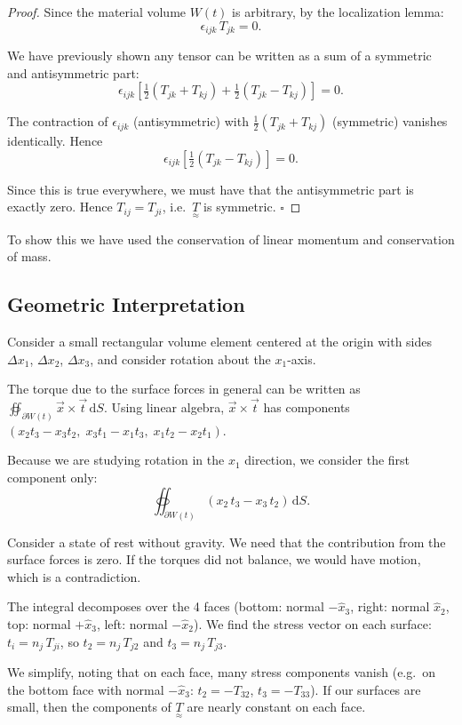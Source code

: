 \documentclass[11pt,a4paper]{article}
\newcommand{\xv}{\vec{x}}
\newcommand{\tv}{\vec{t}}
\newcommand{\tens}[1]{\underset{\approx}{#1}}
\begin{document}
\begin{proof}
Since the material volume $W(t)$ is arbitrary, by the localization lemma:
\[
    \epsilon_{ijk}\, T_{jk} = 0.
\]

We have previously shown any tensor can be written as a sum of a symmetric and antisymmetric part:
\[
    \epsilon_{ijk}\left[\tfrac{1}{2}(T_{jk} + T_{kj}) + \tfrac{1}{2}(T_{jk} - T_{kj})\right] = 0.
\]

The contraction of $\epsilon_{ijk}$ (antisymmetric) with $\tfrac{1}{2}(T_{jk}+T_{kj})$ (symmetric) vanishes identically. Hence
\[
    \epsilon_{ijk}\left[\tfrac{1}{2}(T_{jk} - T_{kj})\right] = 0.
\]

Since this is true everywhere, we must have that the antisymmetric part is exactly zero. Hence $T_{ij} = T_{ji}$, i.e.\ $\tens{T}$ is symmetric. $\square$
\end{proof}

To show this we have used the conservation of linear momentum and conservation of mass.

\subsection{Geometric Interpretation}

Consider a small rectangular volume element centered at the origin with sides $\Delta x_1$, $\Delta x_2$, $\Delta x_3$, and consider rotation about the $x_1$-axis.

The torque due to the surface forces in general can be written as $\oiint_{\partial W(t)} \xv \times \tv\,\mathrm{d}S$. Using linear algebra, $\xv \times \tv$ has components $(x_2 t_3 - x_3 t_2,\; x_3 t_1 - x_1 t_3,\; x_1 t_2 - x_2 t_1)$.

Because we are studying rotation in the $x_1$ direction, we consider the first component only:
\[
    \oiint_{\partial W(t)} (x_2\, t_3 - x_3\, t_2)\,\mathrm{d}S.
\]

Consider a state of rest without gravity. We need that the contribution from the surface forces is zero. If the torques did not balance, we would have motion, which is a contradiction.

The integral decomposes over the 4 faces (bottom: normal $-\hat{x}_3$, right: normal $\hat{x}_2$, top: normal $+\hat{x}_3$, left: normal $-\hat{x}_2$). We find the stress vector on each surface: $t_i = n_j\,T_{ji}$, so $t_2 = n_j\,T_{j2}$ and $t_3 = n_j\,T_{j3}$.

We simplify, noting that on each face, many stress components vanish (e.g.\ on the bottom face with normal $-\hat{x}_3$: $t_2 = -T_{32}$, $t_3 = -T_{33}$). If our surfaces are small, then the components of $\tens{T}$ are nearly constant on each face.
\end{document}
